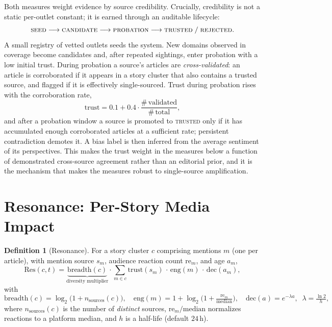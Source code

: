 \documentclass[11pt,a4paper]{article}
\theoremstyle{definition}
\newtheorem{definition}{Definition}[section]
\begin{document}
Both measures weight evidence by source credibility. Crucially, credibility is not a static per-outlet
constant; it is earned through an auditable lifecycle:
\[
  \textsc{seed} \longrightarrow \textsc{candidate} \longrightarrow \textsc{probation}
  \longrightarrow \textsc{trusted} \;/\; \textsc{rejected}.
\]
A small registry of vetted outlets seeds the system. New domains observed in coverage become
candidates and, after repeated sightings, enter probation with a low initial trust. During probation
a source's articles are \emph{cross-validated}: an article is corroborated if it appears in a story
cluster that also contains a trusted source, and flagged if it is effectively single-sourced. Trust
during probation rises with the corroboration rate,
\begin{equation}
  \mathrm{trust} = 0.1 + 0.4\cdot\frac{\#\,\text{validated}}{\#\,\text{total}},
  \label{eq:probation}
\end{equation}
and after a probation window a source is promoted to \textsc{trusted} only if it has accumulated
enough corroborated articles at a sufficient rate; persistent contradiction demotes it. A bias label
is then inferred from the average sentiment of its perspectives. This makes the trust weight in the
measures below a function of demonstrated cross-source agreement rather than an editorial prior, and
it is the mechanism that makes the measures robust to single-source amplification.

\section{Resonance: Per-Story Media Impact}
\label{sec:resonance}

\begin{definition}[Resonance]
\label{def:resonance}
For a story cluster $c$ comprising mentions $m$ (one per article), with mention source $s_m$,
audience reaction count $\mathrm{re}_m$, and age $a_m$,
\begin{equation}
  \mathrm{Res}(c,t) = \underbrace{\mathrm{breadth}(c)}_{\text{diversity multiplier}}
       \cdot \sum_{m\in c} \mathrm{trust}(s_m)\,\cdot\,\mathrm{eng}(m)\,\cdot\,\mathrm{dec}(a_m),
  \label{eq:resonance}
\end{equation}
with
\begin{equation}
  \mathrm{breadth}(c) = \log_2\!\big(1 + n_{\text{sources}}(c)\big),\quad
  \mathrm{eng}(m) = 1 + \log_2\!\Big(1 + \tfrac{\mathrm{re}_m}{\text{median}}\Big),\quad
  \mathrm{dec}(a) = e^{-\lambda a},\;\; \lambda = \tfrac{\ln 2}{h},
  \label{eq:resonance-terms}
\end{equation}
where $n_{\text{sources}}(c)$ is the number of \emph{distinct} sources, $\mathrm{re}_m/\text{median}$
normalizes reactions to a platform median, and $h$ is a half-life (default $24$\,h).
\end{definition}
\end{document}
